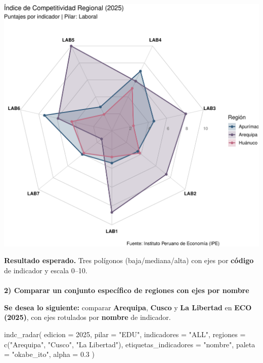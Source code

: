 \documentclass[
  11pt,
  letterpaper,
  DIV=11,
  numbers=noendperiod]{scrartcl}
\makeatletter
\let\oldparagraph\paragraph
\renewcommand{\paragraph}{
    \@ifstar
      \xxxParagraphStar
      \xxxParagraphNoStar
  }
\newcommand{\xxxParagraphStar}[1]{\oldparagraph*{#1}\mbox{}}
\newcommand{\xxxParagraphNoStar}[1]{\oldparagraph{#1}\mbox{}}
\newenvironment{Shaded}{\begin{snugshade}}{\end{snugshade}}
\newcommand{\AttributeTok}[1]{\textcolor[rgb]{0.40,0.45,0.13}{#1}}
\newcommand{\DecValTok}[1]{\textcolor[rgb]{0.68,0.00,0.00}{#1}}
\newcommand{\FloatTok}[1]{\textcolor[rgb]{0.68,0.00,0.00}{#1}}
\newcommand{\FunctionTok}[1]{\textcolor[rgb]{0.28,0.35,0.67}{#1}}
\newcommand{\NormalTok}[1]{\textcolor[rgb]{0.00,0.23,0.31}{#1}}
\newcommand{\StringTok}[1]{\textcolor[rgb]{0.13,0.47,0.30}{#1}}
\makeatother
\begin{document}
\includegraphics{Manual_files/figure-pdf/unnamed-chunk-94-1.pdf}

\textbf{Resultado esperado.} Tres polígonos (baja/mediana/alta) con ejes
por \textbf{código} de indicador y escala 0--10.

\paragraph{\texorpdfstring{\textbf{2) Comparar un conjunto específico de
regiones con ejes por
nombre}}{2) Comparar un conjunto específico de regiones con ejes por nombre}}\label{comparar-un-conjunto-especuxedfico-de-regiones-con-ejes-por-nombre}

\textbf{Se desea lo siguiente:} comparar \textbf{Arequipa},
\textbf{Cusco} y \textbf{La Libertad} en \textbf{ECO (2025)}, con ejes
rotulados por \textbf{nombre} de indicador.

\begin{Shaded}
\begin{Highlighting}[]
\FunctionTok{indc\_radar}\NormalTok{(}
  \AttributeTok{edicion   =} \DecValTok{2025}\NormalTok{,}
  \AttributeTok{pilar     =} \StringTok{"EDU"}\NormalTok{,}
  \AttributeTok{indicadores =} \StringTok{"ALL"}\NormalTok{,}
  \AttributeTok{regiones  =} \FunctionTok{c}\NormalTok{(}\StringTok{"Arequipa"}\NormalTok{, }\StringTok{"Cusco"}\NormalTok{, }\StringTok{"La Libertad"}\NormalTok{),}
  \AttributeTok{etiquetas\_indicadores =} \StringTok{"nombre"}\NormalTok{,}
  \AttributeTok{paleta    =} \StringTok{"okabe\_ito"}\NormalTok{,}
  \AttributeTok{alpha     =} \FloatTok{0.3}
\NormalTok{)}
\end{Highlighting}
\end{Shaded}
\end{document}
